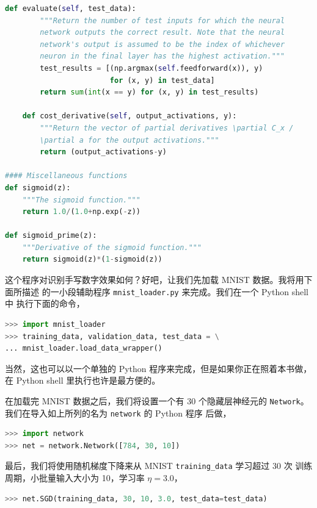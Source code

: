 \begin{lstlisting}[language=Python]
    def evaluate(self, test_data):
        """Return the number of test inputs for which the neural
        network outputs the correct result. Note that the neural
        network's output is assumed to be the index of whichever
        neuron in the final layer has the highest activation."""
        test_results = [(np.argmax(self.feedforward(x)), y)
                        for (x, y) in test_data]
        return sum(int(x == y) for (x, y) in test_results)

    def cost_derivative(self, output_activations, y):
        """Return the vector of partial derivatives \partial C_x /
        \partial a for the output activations."""
        return (output_activations-y)

#### Miscellaneous functions
def sigmoid(z):
    """The sigmoid function."""
    return 1.0/(1.0+np.exp(-z))

def sigmoid_prime(z):
    """Derivative of the sigmoid function."""
    return sigmoid(z)*(1-sigmoid(z))
\end{lstlisting}

这个程序对识别手写数字效果如何？好吧，让我们先加载 MNIST 数据。我将用下面所描述
的一小段辅助程序 \lstinline!mnist_loader.py! 来完成。我们在一个 Python shell 中
执行下面的命令，

\begin{lstlisting}[language=Python]
>>> import mnist_loader
>>> training_data, validation_data, test_data = \
... mnist_loader.load_data_wrapper()
\end{lstlisting}

当然，这也可以以一个单独的 Python 程序来完成，但是如果你正在照着本书做，在
Python shell 里执行也许是最方便的。

在加载完 MNIST 数据之后，我们将设置一个有 30 个隐藏层神经元的
\lstinline!Network!。我们在导入如上所列的名为 \lstinline!network! 的 Python 程序
后做，

\begin{lstlisting}[language=Python]
>>> import network
>>> net = network.Network([784, 30, 10])
\end{lstlisting}

最后，我们将使用随机梯度下降来从 MNIST \lstinline!training_data! 学习超过 30 次
训练周期，小批量输入大小为 10，学习率 $\eta = 3.0$，

\begin{lstlisting}[language=Python]
>>> net.SGD(training_data, 30, 10, 3.0, test_data=test_data)
\end{lstlisting}


